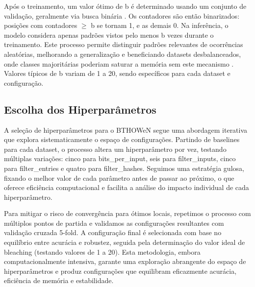 \documentclass{article}
\begin{document}
Após o treinamento, um valor ótimo de b é determinado usando um conjunto de validação, geralmente via busca binária \cite{santiago2020, susskind2022}. Os contadores são então binarizados: posições com contadores $\geq$ b se tornam 1, e as demais 0. Na inferência, o modelo considera apenas padrões vistos pelo menos b vezes durante o treinamento. Este processo permite distinguir padrões relevantes de ocorrências aleatórias, melhorando a generalização e beneficiando datasets desbalanceados, onde classes majoritárias poderiam saturar a memória sem este mecanismo \cite{santiago2020}. Valores típicos de b variam de 1 a 20, sendo específicos para cada dataset e configuração.

\subsection{Escolha dos Hiperparâmetros}

A seleção de hiperparâmetros para o BTHOWeN segue uma abordagem iterativa que explora sistematicamente o espaço de configurações. Partindo de baselines para cada dataset, o processo altera um hiperparâmetro por vez, testando múltiplas variações: cinco para bits\_per\_input, seis para filter\_inputs, cinco para filter\_entries e quatro para filter\_hashes. Seguimos uma estratégia gulosa, fixando o melhor valor de cada parâmetro antes de passar ao próximo, o que oferece eficiência computacional e facilita a análise do impacto individual de cada hiperparâmetro.

Para mitigar o risco de convergência para ótimos locais, repetimos o processo com múltiplos pontos de partida e validamos as configurações resultantes com validação cruzada 5-fold. A configuração final é selecionada com base no equilíbrio entre acurácia e robustez, seguida pela determinação do valor ideal de bleaching (testando valores de 1 a 20). Esta metodologia, embora computacionalmente intensiva, garante uma exploração abrangente do espaço de hiperparâmetros e produz configurações que equilibram eficazmente acurácia, eficiência de memória e estabilidade.
\end{document}

